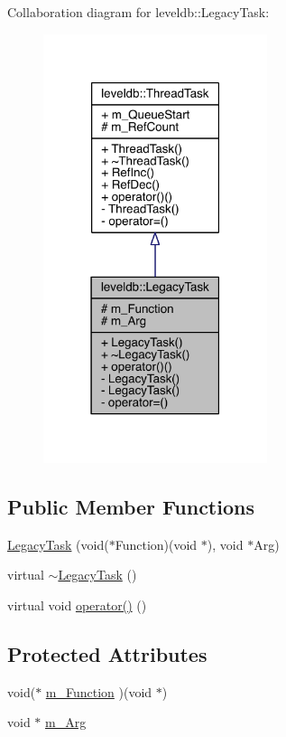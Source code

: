 Collaboration diagram for leveldb\+:\+:Legacy\+Task\+:\nopagebreak
\begin{figure}[H]
\begin{center}
\leavevmode
\includegraphics[width=186pt]{classleveldb_1_1_legacy_task__coll__graph}
\end{center}
\end{figure}
\subsection*{Public Member Functions}
\begin{DoxyCompactItemize}
\item 
\hyperlink{classleveldb_1_1_legacy_task_a77f0925d36035f7b0fad580e494c77df}{Legacy\+Task} (void($\ast$Function)(void $\ast$), void $\ast$Arg)
\item 
virtual \hyperlink{classleveldb_1_1_legacy_task_a4ebaec6bef7a42915e6275e028ba61d7}{$\sim$\+Legacy\+Task} ()
\item 
virtual void \hyperlink{classleveldb_1_1_legacy_task_a82614478501d15d5efec0b35694a6aa8}{operator()} ()
\end{DoxyCompactItemize}
\subsection*{Protected Attributes}
\begin{DoxyCompactItemize}
\item 
void($\ast$ \hyperlink{classleveldb_1_1_legacy_task_a49048d932619d81574332558fc1bea8b}{m\+\_\+\+Function} )(void $\ast$)
\item 
void $\ast$ \hyperlink{classleveldb_1_1_legacy_task_aed35edbd5b9084e087c4dcf0d314af51}{m\+\_\+\+Arg}
\end{DoxyCompactItemize}
